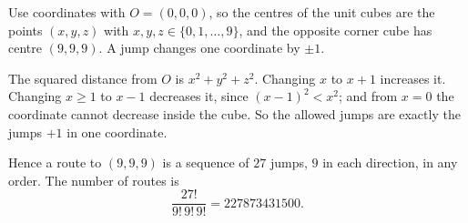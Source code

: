 Use coordinates with $O=(0,0,0)$, so the centres of the unit cubes are the points $(x,y,z)$ with $x,y,z\in\{0,1,\dots,9\}$, and the opposite corner cube has centre $(9,9,9)$. A jump changes one coordinate by $\pm1$.

The squared distance from $O$ is $x^2+y^2+z^2$. Changing $x$ to $x+1$ increases it. Changing $x\ge1$ to $x-1$ decreases it, since $(x-1)^2<x^2$; and from $x=0$ the coordinate cannot decrease inside the cube. So the allowed jumps are exactly the jumps $+1$ in one coordinate.

Hence a route to $(9,9,9)$ is a sequence of $27$ jumps, $9$ in each direction, in any order. The number of routes is
\[
\dfrac{27!}{9!\,9!\,9!}=\boxed{227873431500}.
\]
